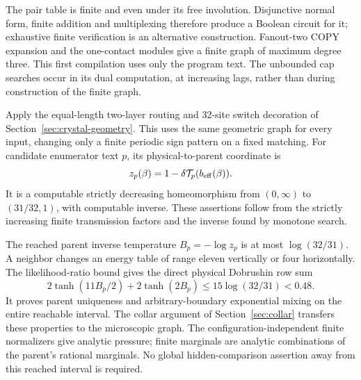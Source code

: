 The pair table is finite and even under its free involution. Disjunctive normal form, finite addition and multiplexing therefore produce a Boolean circuit for it; exhaustive finite verification is an alternative construction. Fanout-two COPY expansion and the one-contact modules give a finite graph of maximum degree three. This first compilation uses only the program text. The unbounded cap searches occur in its dual computation, at increasing lags, rather than during construction of the finite graph.

Apply the equal-length two-layer routing and 32-site switch decoration of Section~\ref{sec:crystal-geometry}. This uses the same geometric graph for every input, changing only a finite periodic sign pattern on a fixed matching. For candidate enumerator text \(p\), its physical-to-parent coordinate is
\[
 z_p(\beta)=1-\delta\mathcal T_p(b_{\rm eff}(\beta)).
\]
It is a computable strictly decreasing homeomorphism from \((0,\infty)\) to \((31/32,1)\), with computable inverse. These assertions follow from the strictly increasing finite transmission factors and the inverse found by monotone search.

The reached parent inverse temperature \(B_p=-\log z_p\) is at most \(\log(32/31)\). A neighbor changes an energy table of range eleven vertically or four horizontally. The likelihood-ratio bound gives the direct physical Dobrushin row sum
\begin{equation}\label{eq:diagram-dobrushin}
 2\tanh(11B_p/2)+2\tanh(2B_p)
 \le15\log(32/31)<0.48.
\end{equation}
It proves parent uniqueness and arbitrary-boundary exponential mixing on the entire reachable interval. The collar argument of Section~\ref{sec:collar} transfers these properties to the microscopic graph. The configuration-independent finite normalizers give analytic pressure; finite marginals are analytic combinations of the parent's rational marginals. No global hidden-comparison assertion away from this reached interval is required.

